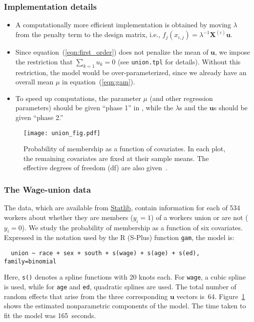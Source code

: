 \documentclass{admbmanual}
\begin{document}
\subsubsection{Implementation details}
\begin{itemize}
  \item A computationally more efficient implementation is obtained by moving
  $\lambda $ from the penalty term to the design matrix, i.e.,
  $f_j(x_{i,j})=\lambda^{-1}\mathbf{X}^{(i)}\mathbf{u}$.

  \item Since equation~(\ref{eqn:first_order}) does not penalize the mean
  of $\mathbf{u}$, we impose the restriction that $\sum_{k=1}u_k=0$ (see
  \texttt{union.tpl} for details). Without this restriction, the model would be
  over-parameterized, since we already have an overall mean $\mu $ in
  equation~(\ref{eqn:gam}).

  \item To speed up computations, the parameter $\mu $ (and other regression
  parameters) should be given ``phase 1'' in \scAB, while the $\lambda $s and
  the $\mathbf{u}$s should be given ``phase 2.''
\end{itemize}

\begin{figure}[htbp]
  \centering\hskip1pt
  \texttt{[image: union\_fig.pdf]}
  \caption{Probability of membership as a function of covariates. In each plot,
    the remaining covariates are fixed at their sample means. The effective
    degrees of freedom (df) are also given~\protect\cite{hast:tibs:1990}.}
  \label{fig:union}
\end{figure}

\subsubsection{The Wage-union data}

The data, which are available from \href{lib.stat.cmu.edu/}{Statlib}, contain
information for each of 534 workers about whether they are members ($y_i=1$)
of a workers union or are not ($y_i=0$). We study the probability of
membership as a function of six covariates. Expressed in the notation used by
the R (S-Plus) function \texttt{gam}, the model is:
\begin{verbatim}
  union ~ race + sex + south + s(wage) + s(age) + s(ed), family=binomial
\end{verbatim}

Here, \texttt{s()} denotes a spline functions with 20 knots each. For
\texttt{wage}, a cubic spline is used, while for \texttt{age} and \texttt{ed},
quadratic splines are used. The total number of random effects that arise from
the three corresponding $\mathbf{u}$ vectors is~64. Figure~\ref{fig:union} shows
the estimated nonparametric components of the model. The time taken to fit the
model was 165~seconds.
\end{document}
